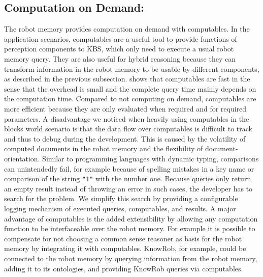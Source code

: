 \subsection{Computation on Demand:}
The robot memory provides computation on demand with computables. In
the application scenarios, computables are a useful tool to provide
functions of perception components to KBS, which only need to execute
a usual robot memory query. They are also useful for hybrid reasoning
because they can transform information in the robot memory to be
usable by different components, as described in the previous
subsection.  shows that
computables are fast in the sense that the overhead is small and the
complete query time mainly depends on the computation time. Compared
to not computing on demand, computables are more efficient because
they are only evaluated when required and for required parameters.
A disadvantage we noticed when heavily using computables in the blocks
world scenario is that the data flow over computables is difficult to
track and thus to debug during the development. This is caused by the
volatility of computed documents in the robot memory and the
flexibility of document-orientation. Similar to programming
languages with dynamic typing, comparisons can unintendedly fail, for
example because of spelling mistakes in a key name or comparison
of the string \texttt{"1"} with the number one. Because queries
only return an empty result instead of throwing an error in such
cases, the developer has to search for the problem. We
simplify this search by providing a configurable logging mechanism of
executed queries, computables, and results.
A major advantage of computables is the added extensibility by
allowing any computation function to be interfaceable over the robot
memory. For example it is possible to compensate for not choosing a
common sense reasoner as basis for the robot memory by integrating it
with computables. KnowRob, for example, could be connected to the
robot memory by querying information from the robot memory, adding it
to its ontologies, and providing KnowRob queries via computables.

